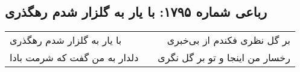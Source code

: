 \begin{center}
\section*{رباعی شماره ۱۷۹۵: با یار به گلزار شدم رهگذری}
\label{sec:1795}
\begin{longtable}{l p{0.5cm} r}
با یار به گلزار شدم رهگذری
&&
بر گل نظری فکندم از بی‌خبری
\\
دلدار به من گفت که شرمت بادا
&&
رخسار من اینجا و تو بر گل نگری
\\
\end{longtable}
\end{center}
